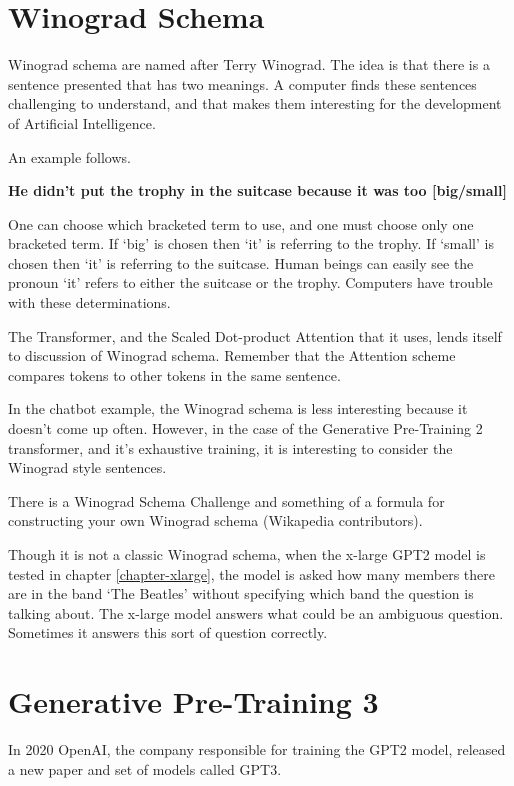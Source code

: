 \section{Winograd Schema}

Winograd schema are named after Terry Winograd. The idea is that there is a sentence presented that has two meanings. A computer finds these sentences challenging to understand, and that makes them interesting for the development of Artificial Intelligence.

An example follows.

\begin{center}
	\textbf{He didn't put the trophy in the suitcase because it was too [big/small]}
\end{center}

One can choose which bracketed term to use, and one must choose only one bracketed term. If `big' is chosen then `it' is referring to the trophy. If `small' is chosen then `it' is referring to the suitcase. Human beings can easily see the pronoun `it' refers to either the suitcase or the trophy. Computers have trouble with these determinations.

The Transformer, and the Scaled Dot-product Attention that it uses, lends itself to discussion of Winograd schema. Remember that the Attention scheme compares tokens to other tokens in the same sentence. 

In the chatbot example, the Winograd schema is less interesting because it doesn't come up often. However, in the case of the Generative Pre-Training 2 transformer, and it's exhaustive training, it is interesting to consider the Winograd style sentences.

There is a Winograd Schema Challenge and something of a formula for constructing your own Winograd schema (Wikapedia contributors). \cite{wiki:xxx}

Though it is not a classic Winograd schema, when the x-large GPT2 model is tested in chapter \ref{chapter-xlarge}, the model is asked how many members there are in the band `The Beatles' without specifying which band the question is talking about. The x-large model answers what could be an ambiguous question. Sometimes it answers this sort of question correctly.

\section{Generative Pre-Training 3}

In 2020 OpenAI, the company responsible for training the GPT2 model, released a new paper and set of models called GPT3.

